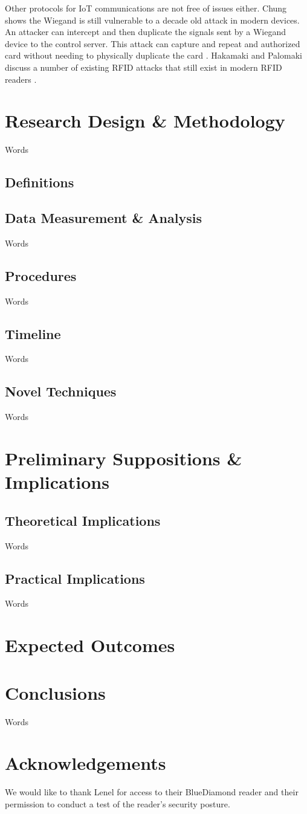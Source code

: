 \documentclass[10pt,twocolumn,letterpaper]{article}
\begin{document}
Other protocols for IoT communications are not free of issues either. Chung shows the Wiegand is still vulnerable to a decade old attack in modern devices. An attacker can intercept and then duplicate the signals sent by a Wiegand device to the control server. This attack can capture and repeat and authorized card without needing to physically duplicate the card \cite{chung2017wiegand}. Hakamaki and Palomaki discuss a number of existing RFID attacks that still exist in modern RFID readers \cite{rfid15}.

\section{Research Design \& Methodology}
Words

\subsection{Definitions}

\subsection{Data Measurement & Analysis}
Words

\subsection{Procedures}
Words

\subsection{Timeline}
Words

\subsection{Novel Techniques}
Words

\section{Preliminary Suppositions \& Implications}

\subsection{Theoretical Implications}
Words

\subsection{Practical Implications}
Words

\section{Expected Outcomes}

\section{Conclusions}
Words

\section{Acknowledgements}
We would like to thank Lenel for access to their BlueDiamond reader and their permission to conduct a test of the reader's security posture.




\end{document}
